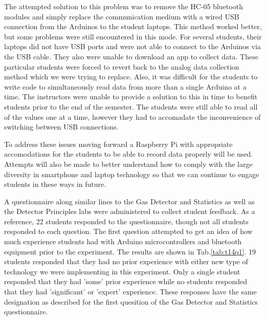 The attempted solution to this problem was to remove the HC-05 bluetooth modules and simply replace the communication medium with a wired USB connection from the Arduinos to the student laptops.
This method worked better, but some problems were still encountered in this mode.
For several students, their laptops did not have USB ports and were not able to connect to the Arduinos via the USB cable.
They also were unable to download an app to collect data.
These particular students were forced to revert back to the analog data collection method which we were trying to replace.
Also, it was difficult for the students to write code to simultaneously read data from more than a single Arduino at a time.
The instructors were unable to provide a solution to this in time to benefit students prior to the end of the semester.
The students were still able to read all of the values one at a time, however they had to accomadate the inconvenience of switching between USB connections.

To address these issues moving forward a Raspberry Pi with appropriate accomodations for the students to be able to record data properly will be used.
Attempts will also be made to better understand how to comply with the large diversity in smartphone and laptop technology so that we can continue to engage students in these ways in future.

A questionnaire along similar lines to the Gas Detector and Statistics as well as the Detector Principles labs were administered to collect student feedback.
As a reference, 22 students responded to the questionnaire, though not all students responded to each question.
The first question attempted to get an idea of how much experience students had with Arduino microcontrollers and bluetooth equipment prior to the experiment.
The results are shown in Tab.\ref{tab:t14q1}.
19 students responded that they had no prior experience with either new type of technology we were implementing in this experiment.
Only a single student responded that they had 'some' prior experience while no students responded that they had 'significant' or 'expert' experience.
These responses have the same designation as described for the first quesition of the Gas Detector and Statistics questionnaire.

